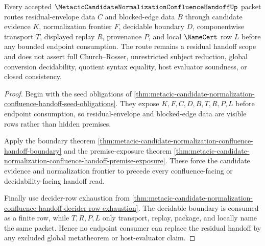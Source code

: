 \begin{theorem}
\label{thm:metacic-candidate-normalization-residual-handoff-scope}
Every accepted $\MetacicCandidateNormalizationConfluenceHandoffUp$ packet routes residual-envelope data $C$ and blocked-edge data $B$ through candidate evidence $K$, normalization frontier $F$, decidable boundary $D$, componentwise transport $T$, displayed replay $R$, provenance $P$, and local $\NameCert$ row $L$ before any bounded endpoint consumption. The route remains a residual handoff scope and does not assert full Church--Rosser, unrestricted subject reduction, global conversion decidability, quotient syntax equality, host evaluator soundness, or closed consistency.
\end{theorem}
\begin{proof}
Begin with the seed obligations of \autoref{thm:metacic-candidate-normalization-confluence-handoff-seed-obligations}. They expose $K,F,C,D,B,T,R,P,L$ before endpoint consumption, so residual-envelope and blocked-edge data are visible rows rather than hidden premises.

Apply the boundary theorem \autoref{thm:metacic-candidate-normalization-confluence-handoff-boundary} and the premise-exposure theorem \autoref{thm:metacic-candidate-normalization-confluence-handoff-premise-exposure}. These force the candidate evidence and normalization frontier to precede every confluence-facing or decidability-facing handoff read.

Finally use decider-row exhaustion from \autoref{thm:metacic-candidate-normalization-confluence-handoff-decider-row-exhaustion}. The decidable boundary is consumed as a finite row, while $T,R,P,L$ only transport, replay, package, and locally name the same packet. Hence no endpoint consumer can replace the residual handoff by any excluded global metatheorem or host-evaluator claim.
\end{proof}

